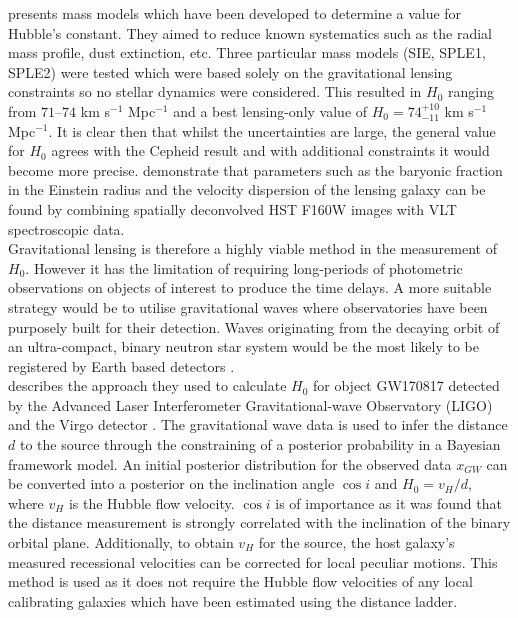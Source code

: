 \documentclass[12pt, onecolumn]{revtex4}    %
\begin{document}
\cite{2003ApJ...599...70K} presents mass models which have been developed to determine a value for Hubble's constant. They aimed to reduce known systematics such as the radial mass profile, dust extinction, etc. Three particular mass models (SIE, SPLE1, SPLE2) were tested which were based solely on the gravitational lensing constraints so no stellar dynamics were considered. This resulted in $H_0$ ranging from $71$--$74$ km s$^{-1}$ Mpc$^{-1}$ and a best lensing-only value of $H_0=74^{+10}_{-11}$ km s$^{-1}$ Mpc$^{-1}$. It is clear then that whilst the uncertainties are large, the general value for $H_0$ agrees with the Cepheid result and with additional constraints it would become more precise. \cite{2011A&A...536A..53C} demonstrate that parameters such as the baryonic fraction in the Einstein radius and the velocity dispersion of the lensing galaxy can be found by combining spatially deconvolved HST F160W images with VLT spectroscopic data. \\

Gravitational lensing is therefore a highly viable method in the measurement of $H_0$. However it has the limitation of requiring long-periods of photometric observations on objects of interest to produce the time delays. A more suitable strategy would be to utilise gravitational waves where observatories have been purposely built for their detection. Waves originating from the decaying orbit of an ultra-compact, binary neutron star system would be the most likely to be registered by Earth based detectors \citep{Schutz:1986aa}. \\

\cite{2017Natur.551...85A} describes the approach they used to calculate $H_0$ for object GW170817 detected by the Advanced Laser Interferometer Gravitational-wave Observatory (LIGO) \citep{2015CQGra..32g4001L} and the Virgo detector \citep{2015CQGra..32b4001A}. The gravitational wave data is used to infer the distance $d$ to the source through the constraining of a posterior probability in a Bayesian framework model. An initial posterior distribution for the observed data $x_{GW}$ can be converted into a posterior on the inclination angle $\cos{i}$ and $H_0=v_H/d$, where $v_H$ is the Hubble flow velocity. $\cos{i}$ is of importance as it was found that the distance measurement is strongly correlated with the inclination of the binary orbital plane. Additionally, to obtain $v_H$ for the source, the host galaxy's measured recessional velocities can be corrected for local peculiar motions. This method is used as it does not require the Hubble flow velocities of any local calibrating galaxies which have been estimated using the distance ladder. \\
\end{document}

